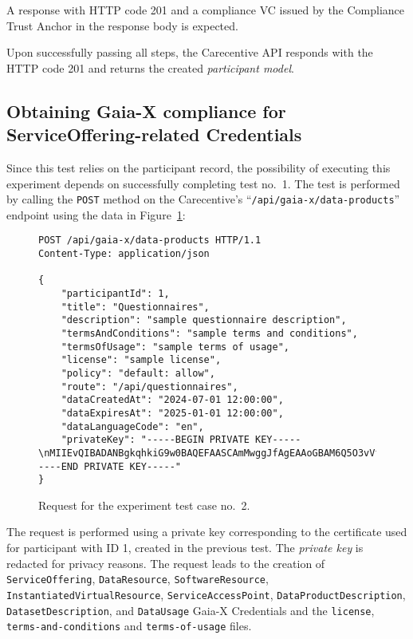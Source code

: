 A response with HTTP code 201 and a compliance VC issued by the Compliance Trust Anchor in the response body is expected.

Upon successfully passing all steps, the Carecentive API responds with the HTTP code 201 and returns the created \textit{participant model}.

\subsection[Service Offering Compliance]{Obtaining Gaia-X compliance for ServiceOffering-related Credentials}\label{subsec:service-offering-compliance}

Since this test relies on the participant record, the possibility of executing this experiment depends on successfully completing test no.~1.
The test is performed by calling the \texttt{POST} method on the Carecentive's ``\texttt{/api\-/gaia-x\-/data-products}'' endpoint using the data in Figure~\ref{fig:test_case_2}:

\begin{figure}[h]
    \centering
    \begin{verbatim}
POST /api/gaia-x/data-products HTTP/1.1
Content-Type: application/json

{
    "participantId": 1,
	"title": "Questionnaires",
	"description": "sample questionnaire description",
	"termsAndConditions": "sample terms and conditions",
	"termsOfUsage": "sample terms of usage",
	"license": "sample license",
	"policy": "default: allow",
	"route": "/api/questionnaires",
	"dataCreatedAt": "2024-07-01 12:00:00",
	"dataExpiresAt": "2025-01-01 12:00:00",
	"dataLanguageCode": "en",
	"privateKey": "-----BEGIN PRIVATE KEY-----\nMIIEvQIBADANBgkqhkiG9w0BAQEFAASCAmMwggJfAgEAAoGBAM6Q5O3vVfnxk6P7\n...\nYWw+HiFJh9XQpRUtv9PV8L8AqFFfMdsOpT6pgC+aA/WB\n-----END PRIVATE KEY-----"
}
    \end{verbatim}
    \caption{Request for the experiment test case no.~2.}\label{fig:test_case_2}
\end{figure}

The request is performed using a private key corresponding to the certificate used for participant with ID 1, created in the previous test.
The \textit{private key} is redacted for privacy reasons.
The request leads to the creation of \texttt{ServiceOffering}, \texttt{DataResource}, \texttt{SoftwareResource}, \texttt{InstantiatedVirtualResource}, \texttt{ServiceAccessPoint}, \texttt{DataProductDescription}, \texttt{DatasetDescription}, and \texttt{DataUsage} Gaia-X Credentials and the \texttt{license}, \texttt{terms-and-conditions} and \texttt{terms-of-usage} files.

